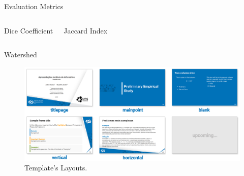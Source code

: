 \begin{frame}{Evaluation Metrics}
    \begin{columns}
        \begin{block}{Dice Coefficient}
        \end{block}
        \begin{block}{Jaccard Index}
        \end{block}
    \end{columns}
\end{frame}

\begin{frame}{Watershed}
    \begin{figure}
        \centering
        \includegraphics[width=.9\textwidth]{readme/layouts.png}
        \caption{Template's Layouts.}
        \label{fig:watershed}
    \end{figure}
\end{frame}
